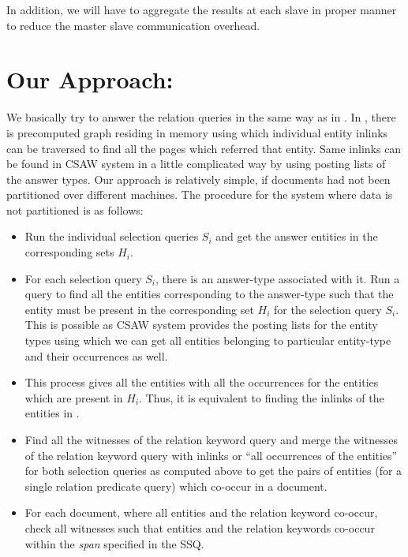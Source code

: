 \documentclass[11pt]{report}
\begin{document}
In addition, we will have to aggregate the results at each slave in proper manner to reduce the master slave communication overhead.

\section{Our Approach:}
We basically try to answer the relation queries in the same way as in \cite{wikibanks}. In \cite{wikibanks}, there is precomputed graph residing in memory using which
individual entity inlinks can be traversed to find all the pages which referred that entity. Same inlinks can be found in CSAW system in a little complicated way by using
posting lists of the answer types. Our approach is relatively simple, if documents had not been partitioned over different machines. The procedure for the system
where data is not partitioned is as follows:
\begin{itemize}
 \item Run the individual selection queries $S_i$ and get the answer entities in the corresponding sets $H_i$.
 \item For each selection query $S_i$, there is an answer-type associated with it. Run a query to find all the entities corresponding to the answer-type such that
  the entity must be present in the corresponding set $H_i$ for the selection query $S_i$. This is possible as CSAW system provides the posting lists for 
the entity types using which we can get all entities belonging to particular entity-type and their occurrences as well.
 \item This process gives all the entities with all the occurrences for the entities which are present in $H_i$. Thus, it is equivalent to finding
  the inlinks of the entities in \cite{wikibanks}.
 \item Find all the witnesses of the relation keyword query and merge the witnesses of the relation keyword query with inlinks or ``all occurrences of the entities'' for both selection queries as computed above to get 
the pairs of entities (for a single relation predicate query) which co-occur in a document.
 \item For each document, where all entities and the relation keyword co-occur, check all witnesses such that entities and the relation keywords co-occur
  within the \textit{span} specified in the SSQ.
\end{itemize}
\end{document}
